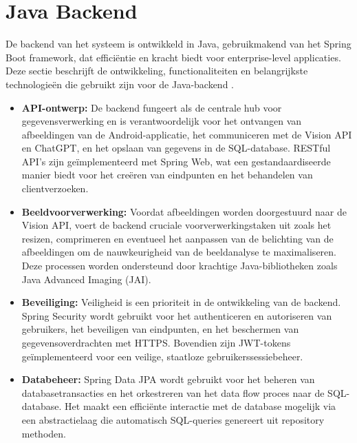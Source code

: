 \section{Java Backend}
De backend van het systeem is ontwikkeld in Java, gebruikmakend van het Spring Boot framework, dat efficiëntie en kracht biedt voor enterprise-level applicaties. Deze sectie beschrijft de ontwikkeling, functionaliteiten en belangrijkste technologieën die gebruikt zijn voor de Java-backend \autocite{VisionBackEnd}.

\begin{itemize}
    \item \textbf{API-ontwerp:} De backend fungeert als de centrale hub voor gegevensverwerking en is verantwoordelijk voor het ontvangen van afbeeldingen van de Android-applicatie, het communiceren met de Vision API en ChatGPT, en het opslaan van gegevens in de SQL-database. RESTful API's zijn geïmplementeerd met Spring Web, wat een gestandaardiseerde manier biedt voor het creëren van eindpunten en het behandelen van clientverzoeken.
    
    \item \textbf{Beeldvoorverwerking:} Voordat afbeeldingen worden doorgestuurd naar de Vision API, voert de backend cruciale voorverwerkingstaken uit zoals het resizen, comprimeren en eventueel het aanpassen van de belichting van de afbeeldingen om de nauwkeurigheid van de beeldanalyse te maximaliseren. Deze processen worden ondersteund door krachtige Java-bibliotheken zoals Java Advanced Imaging (JAI).
    
    \item \textbf{Beveiliging:} Veiligheid is een prioriteit in de ontwikkeling van de backend. Spring Security wordt gebruikt voor het authenticeren en autoriseren van gebruikers, het beveiligen van eindpunten, en het beschermen van gegevensoverdrachten met HTTPS. Bovendien zijn JWT-tokens geïmplementeerd voor een veilige, staatloze gebruikerssessiebeheer.
    
    \item \textbf{Databeheer:} Spring Data JPA wordt gebruikt voor het beheren van databasetransacties en het orkestreren van het data flow proces naar de SQL-database. Het maakt een efficiënte interactie met de database mogelijk via een abstractielaag die automatisch SQL-queries genereert uit repository methoden.
    
\end{itemize}


\pagebreak

